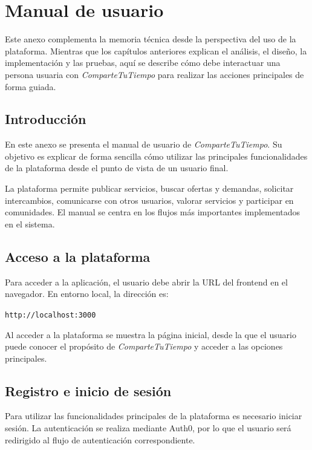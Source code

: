 \chapter{Manual de usuario}\label{anexo:manual_usuario}

Este anexo complementa la memoria técnica desde la perspectiva del uso de la plataforma. Mientras que los capítulos anteriores explican el análisis, el diseño, la implementación y las pruebas, aquí se describe cómo debe interactuar una persona usuaria con \textit{ComparteTuTiempo} para realizar las acciones principales de forma guiada.

\section{Introducción}

En este anexo se presenta el manual de usuario de \textit{ComparteTuTiempo}. Su objetivo es explicar de forma sencilla cómo utilizar las principales funcionalidades de la plataforma desde el punto de vista de un usuario final.

La plataforma permite publicar servicios, buscar ofertas y demandas, solicitar intercambios, comunicarse con otros usuarios, valorar servicios y participar en comunidades. El manual se centra en los flujos más importantes implementados en el sistema.

\section{Acceso a la plataforma}

Para acceder a la aplicación, el usuario debe abrir la URL del frontend en el navegador. En entorno local, la dirección es:

\begin{center}
\texttt{http://localhost:3000}
\end{center}

Al acceder a la plataforma se muestra la página inicial, desde la que el usuario puede conocer el propósito de \textit{ComparteTuTiempo} y acceder a las opciones principales.

\section{Registro e inicio de sesión}

Para utilizar las funcionalidades principales de la plataforma es necesario iniciar sesión. La autenticación se realiza mediante Auth0, por lo que el usuario será redirigido al flujo de autenticación correspondiente.

